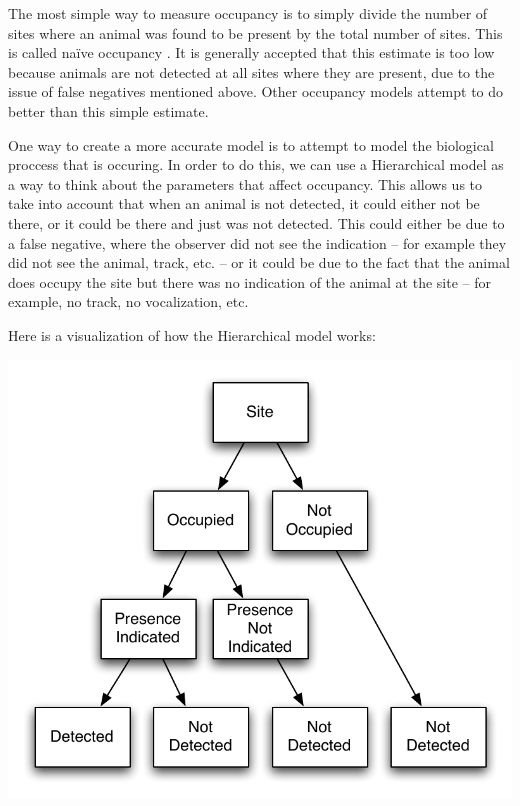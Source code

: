 \documentclass[12pt]{article}
\begin{document}
    The most simple way to measure occupancy is to simply divide the number of
    sites where an animal was found to be present by the total number of sites.
    This is called na\"ive occupancy \cite{MacKenzie2006}. It is generally
    accepted that this estimate is too low because animals are not detected at
    all sites where they are present, due to the issue of false negatives
    mentioned above. Other occupancy models attempt to do better than this
    simple estimate.

    One way to create a more accurate model is to attempt to model the biological 
proccess that is occuring.  In order to do this, we can use a Hierarchical model as a
    way to think about the parameters that affect occupancy. This allows us to
    take into account that when an animal is not detected, it could either not
    be there, or it could be there and just was not detected. This could either
    be due to a false negative, where the observer did not see the indication --
    for example they did not see the animal, track, etc. -- or it could be due
    to the fact that the animal does occupy the site but there was no indication
    of the animal at the site -- for example, no track, no vocalization, etc.

    Here is a visualization of how the Hierarchical model works:

    \begin{center}
        \includegraphics[scale=0.75]{SimpleHierarchicalModel}
    \end{center}
\end{document}
